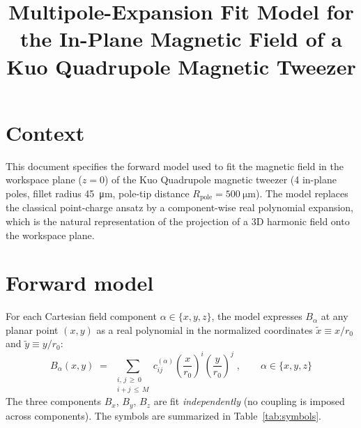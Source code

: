 \documentclass[11pt]{article}
\title{Multipole-Expansion Fit Model for the In-Plane Magnetic Field
       of a Kuo Quadrupole Magnetic Tweezer}
\author{}
\date{}
\begin{document}
\maketitle
\vspace{-2em}

\section*{Context}
This document specifies the forward model used to fit the magnetic
field in the workspace plane ($z = 0$) of the Kuo Quadrupole
magnetic tweezer (4 in-plane poles, fillet radius
\SI{45}{\micro\metre}, pole-tip distance
$R_{\text{pole}} = \SI{500}{\micro\metre}$). The model replaces the
classical point-charge ansatz by a component-wise real polynomial
expansion, which is the natural representation of the projection of
a 3D harmonic field onto the workspace plane.

\section{Forward model}
\label{sec:forward}

For each Cartesian field component
$\alpha \in \{x, y, z\}$, the model expresses
$B_\alpha$ at any planar point $(x, y)$ as a real polynomial in
the normalized coordinates $\tilde{x} \equiv x / r_0$ and
$\tilde{y} \equiv y / r_0$:
%
\begin{equation}
\label{eq:model}
\boxed{\;
B_\alpha(x, y) \;=\;
\sum_{\substack{i,\, j \,\ge\, 0 \\ i + j \,\le\, M}}
   c^{(\alpha)}_{ij}
   \left(\frac{x}{r_0}\right)^{i}
   \left(\frac{y}{r_0}\right)^{j}
\;,\qquad
\alpha \in \{x, y, z\}
\;}
\end{equation}
%
The three components $B_x$, $B_y$, $B_z$ are fit \emph{independently}
(no coupling is imposed across components).
The symbols are summarized in Table~\ref{tab:symbols}.
\end{document}
